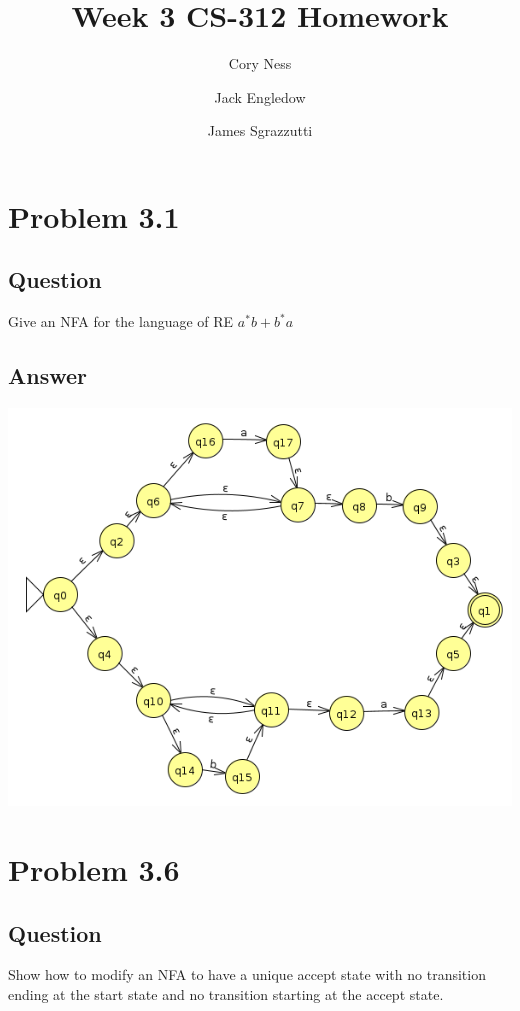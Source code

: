 \documentclass[12pt, a4paper]{article}
\title{Week 3 CS-312 Homework}
\author{
	Cory Ness
	\and
	Jack Engledow
	\and
	James Sgrazzutti
}
\begin{document}
\maketitle

\section{Problem 3.1}
\subsection{Question}
Give an NFA for the language of RE $a^{*}b+b^{*}a$
\subsection{Answer}
\begin{center}
\includegraphics[scale=0.7]{3.1}
\end{center}

\section{Problem 3.6}
\subsection{Question}
Show how to modify an NFA to have a unique accept state with no transition ending at the start state and no transition starting at the accept state.
\end{document}
